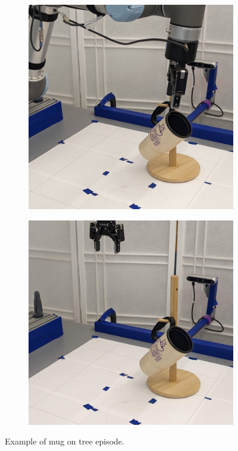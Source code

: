 \documentclass{article}
\begin{document}
\begin{figure}[]
\begin{subfigure}{(\linewidth - 0.05\linewidth)/5}
    \end{subfigure}
    \begin{subfigure}{(\linewidth - 0.05\linewidth)/5}
        \centering
        \includegraphics[width=\linewidth]{figures/episodes/mug_on_tree_zoom/9.jpg}
    \end{subfigure}
    \begin{subfigure}{(\linewidth - 0.05\linewidth)/5}
        \centering
        \includegraphics[width=\linewidth]{figures/episodes/mug_on_tree_zoom/10.jpg}
    \end{subfigure}

    \caption{Example of mug on tree episode.}
    \label{fig:mug_tree_episode}
\end{figure}
\end{document}
